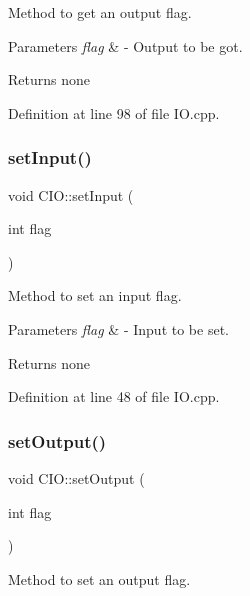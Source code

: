 Method to get an output flag. 


\begin{DoxyParams}{Parameters}
{\em flag} & -\/ Output to be got. \\
\hline
\end{DoxyParams}
\begin{DoxyReturn}{Returns}
none 
\end{DoxyReturn}


Definition at line 98 of file I\+O.\+cpp.

\mbox{\label{class_c_i_o_ac61124eef35d5b751783010b39b24b0d}} 
\subsubsection{\texorpdfstring{set\+Input()}{setInput()}}
{\footnotesize\ttfamily void C\+I\+O\+::set\+Input (\begin{DoxyParamCaption}\item[{int}]{flag }\end{DoxyParamCaption})}



Method to set an input flag. 


\begin{DoxyParams}{Parameters}
{\em flag} & -\/ Input to be set. \\
\hline
\end{DoxyParams}
\begin{DoxyReturn}{Returns}
none 
\end{DoxyReturn}


Definition at line 48 of file I\+O.\+cpp.

\mbox{\label{class_c_i_o_afc99e1a01c6de3f5f6126db69f8fd00e}} 
\subsubsection{\texorpdfstring{set\+Output()}{setOutput()}}
{\footnotesize\ttfamily void C\+I\+O\+::set\+Output (\begin{DoxyParamCaption}\item[{int}]{flag }\end{DoxyParamCaption})}



Method to set an output flag. 


